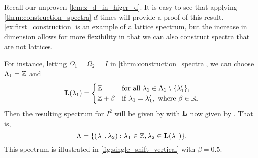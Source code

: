 \documentclass[../thesis.tex]{subfiles}
\begin{document}
Recall our unproven \cref{lem:z_d_in_higer_d}. It is easy to see that applying \cref{thrm:construction_spectra} $d$ times will provide a proof of this result. \cref{ex:first_construction} is an example of a lattice spectrum, but the increase in dimension allows for more flexibility in that we can also construct spectra that are not lattices. %
\begin{example}\label{ex:single_shift_vertical}
    For instance, letting $\Omega_1=\Omega_2 = I$ in \cref{thrm:construction_spectra}, we can choose $\Lambda_1 = \mathbb{Z}$ and 
    \begin{align}\label{eq:single_shift_vertical}
        \mathbf{L}(\lambda_1) = \begin{cases}        
            \mathbb{Z} & \text{for all } \lambda_1 \in \Lambda_1\setminus\{\lambda_1'\},\\        
            \mathbb{Z}+\beta & \text{if } \lambda_1=\lambda_1',\text{ where } \beta \in \mathbb{R}.   
        \end{cases}
    \end{align}
    Then the resulting spectrum for $I^2$ will be given by  with $\mathbf{L}$ now given by . That is,
    \begin{equation*}
        \Lambda = \{(\lambda_1, \lambda_2): \lambda_1\in \mathbb{Z}, \lambda_2 \in \mathbf{L}(\lambda_1)\}.
    \end{equation*}
    This spectrum is illustrated in \cref{fig:single_shift_vertical} with $\beta = 0.5$.
\end{example} %
\end{document}
